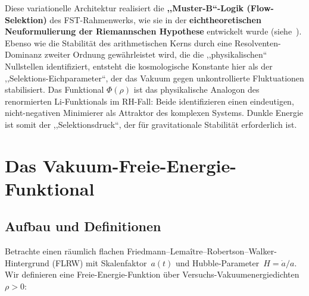 \documentclass[12pt,a4paper]{article}
\theoremstyle{definition}
\theoremstyle{plain}
\theoremstyle{remark}
\begin{document}
Diese variationelle Architektur realisiert die \textbf{,,Muster-B``-Logik (Flow-Selektion)} des FST-Rahmenwerks, wie sie in der \textbf{eichtheoretischen Neuformulierung der Riemannschen Hypothese} entwickelt wurde (siehe~\cite{GeigerRH2026c}). Ebenso wie die Stabilit\"at des arithmetischen Kerns durch eine Resolventen-Dominanz zweiter Ordnung gew\"ahrleistet wird, die die ,,physikalischen`` Nullstellen identifiziert, entsteht die kosmologische Konstante hier als der ,,Selektions-Eichparameter``, der das Vakuum gegen unkontrollierte Fluktuationen stabilisiert. Das Funktional $\Phi(\rho)$ ist das physikalische Analogon des renormierten Li-Funktionals im RH-Fall: Beide identifizieren einen eindeutigen, nicht-negativen Minimierer als Attraktor des komplexen Systems. Dunkle Energie ist somit der ,,Selektionsdruck``, der f\"ur gravitationale Stabilit\"at erforderlich ist.

\section{Das Vakuum-Freie-Energie-Funktional}\label{sec:functional}

\subsection{Aufbau und Definitionen}

Betrachte einen r\"aumlich flachen Friedmann--Lema\^itre--Robertson--Walker-Hintergrund (FLRW)
mit Skalenfaktor~$a(t)$ und Hubble-Parameter~$H = \dot{a}/a$.
Wir definieren eine Freie-Energie-Funktion \"uber Versuchs-Vakuumenergiedichten~$\rho > 0$:
\end{document}
